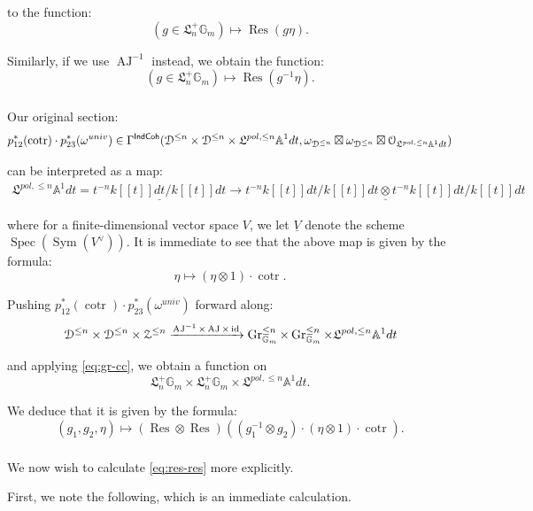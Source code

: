 \documentclass[reqno,11pt]{amsart}
\numberwithin{equation}{subsection}
\theoremstyle{remark}
\newcommand{\xar}[1]{\xrightarrow{#1}}
\newcommand{\bA}{{\mathbb A}}
\newcommand{\bG}{{\mathbb G}}
\newcommand{\sD}{{\EuScript D}}
\newcommand{\sO}{{\EuScript O}}
\newcommand{\sZ}{{\EuScript Z}}
\newcommand{\fL}{{\mathfrak L}}
\newcommand{\on}{\operatorname}
\newcommand{\ul}{\underline}
\newcommand{\Spec}{\on{Spec}}
\newcommand{\id}{\on{id}}
\newcommand{\cotr}{\on{cotr}}
\newcommand{\Res}{\on{Res}}
\newcommand{\Gr}{\on{Gr}}
\newcommand{\Sym}{\on{Sym}}
\newcommand{\IndCoh}{\mathsf{IndCoh}}
\newcommand{\AJ}{\on{AJ}}
\begin{document}
\noindent to the function:
%
\[
(g \in \fL_n^+\bG_m) \mapsto \Res(g \eta).
\]

\noindent Similarly, if we use $\AJ^{-1}$ instead, we obtain the
function:
%
\[
(g \in \fL_n^+\bG_m) \mapsto \Res(g^{-1} \eta).
\]

\subsubsection{}

Our original section:
%
\[
p_{12}^*(\cotr) \cdot p_{23}^*(\omega^{univ}) \in 
\Gamma^{\IndCoh}(\sD^{\leq n} \times \sD^{\leq n} \times 
\fL^{pol,\leq n} \bA^1 dt,
\omega_{\sD^{\leq n}} \boxtimes \omega_{\sD^{\leq n}} \boxtimes 
\sO_{\fL^{pol,\leq n} \bA^1 dt})
\]

\noindent can be interpreted as a map:
%
\[
\begin{gathered}
\fL^{pol,\leq n} \bA^1 dt = 
\ul{t^{-n}k[[t]]dt/k[[t]]dt} \to 
\ul{t^{-n}k[[t]]dt/k[[t]]dt \otimes t^{-n}k[[t]]dt/k[[t]]dt}
\end{gathered}
\]

\noindent where for a finite-dimensional vector
space $V$, we let $\ul{V}$ denote the scheme $\Spec(\Sym(V^{\vee}))$.
It is immediate to see that the above map is given
by the formula:
%
\[
\eta \mapsto (\eta \otimes 1) \cdot \cotr.
\]

Pushing $p_{12}^*(\cotr) \cdot p_{23}^*(\omega^{univ})$ forward along:
%
\[
\sD^{\leq n} \times \sD^{\leq n} \times \sZ^{\leq n}
\xar{\AJ^{-1} \times \AJ \times \id}
\Gr_{\bG_m}^{\leq n} \times \Gr_{\bG_m}^{\leq n} \times \fL^{pol,\leq n} \bA^1 dt
\]

\noindent and applying \eqref{eq:gr-cc}, we obtain a function on 
%
\[
\fL_n^+\bG_m \times \fL_n^+\bG_m \times \fL^{pol,\leq n} \bA^1 dt.
\]

\noindent We deduce that it is given by the formula:
%
\begin{equation}\label{eq:res-res}
(g_1,g_2,\eta) \mapsto 
(\Res \otimes \Res)((g_1^{-1} \otimes g_2) \cdot 
(\eta \otimes 1) \cdot \cotr).
\end{equation}

\subsubsection{}

We now wish to calculate \eqref{eq:res-res} more explicitly. 

First, we note the following, which is an immediate calculation.
\end{document}
